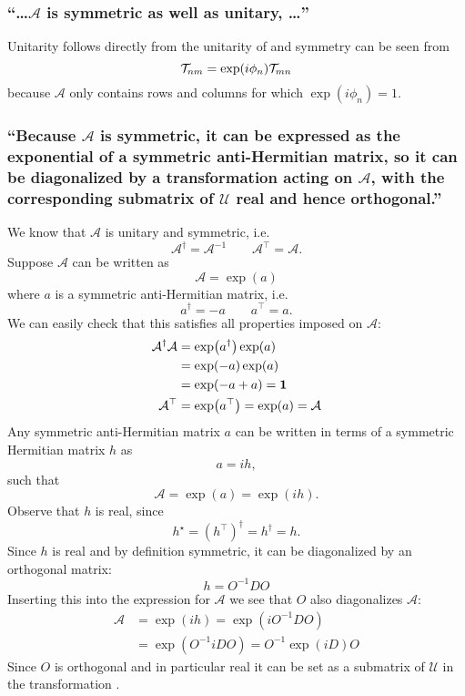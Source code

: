\subsubsection{\enquote{\dots $\mathcal{A}$ is symmetric as well as unitary, \dots} }

Unitarity follows directly from the unitarity of \timereversalmatrix and symmetry can be seen from \[\mathcal{T}_{nm}=\exp(i\phi_n)\mathcal{T}_{mn}\] because $\mathcal{A}$ only contains rows and columns for which $\exp(i\phi_n)=1$.


\subsubsection{\enquote{Because $\mathcal{A}$ is symmetric, it can be expressed as the exponential of a symmetric anti-Hermitian matrix, so it can be diagonalized by a transformation  acting on $\mathcal{A}$, with the corresponding submatrix of $\mathcal{U}$ real and hence orthogonal.} }

We know that $\mathcal{A}$ is unitary and symmetric, i.e.
\[\mathcal{A}^\dagger=\mathcal{A}^{-1}\qquad \mathcal{A}^\top=\mathcal{A}.\]
Suppose $\mathcal{A}$ can be written as \[\mathcal{A}=\exp(a)\] where $a$ is a symmetric anti-Hermitian matrix, i.e.
\[a^\dagger=-a\qquad a^\top=a.\]
We can easily check that this satisfies all properties imposed on $\mathcal{A}$:
\begin{align*}
	\mathcal{A}^\dagger \mathcal{A}&=\exp(a^\dagger)\exp(a)\\
	&=\exp(-a)\exp(a)\\
	&=\exp(-a+a)=\mathbf{1}\\
	\mathcal{A}^\top&=\exp(a^\top)=\exp(a)=\mathcal{A}
\end{align*}
Any symmetric anti-Hermitian matrix $a$ can be written in terms of a symmetric Hermitian matrix $h$ as \[a=ih,\]
such that \[\mathcal{A}=\exp(a)=\exp(i h).\]
Observe that $h$ is real, since
\[h^\star=\left(h^\top\right)^\dagger=h^\dagger=h.\]
Since $h$ is real and by definition symmetric, it can be diagonalized by an orthogonal matrix:
\[h=O^{-1}D O\]
Inserting this into the expression for $\mathcal{A}$ we see that $O$ also diagonalizes  $\mathcal{A}$:
\begin{align*}
	\mathcal{A}&=\exp(i h)=\exp(i O^{-1}D O)\\
	&=\exp( O^{-1}iD O)=O^{-1}\exp(iD)O
\end{align*}
Since $O$ is orthogonal and in particular real it can be set as a submatrix of $\mathcal{U}$ in the transformation .


